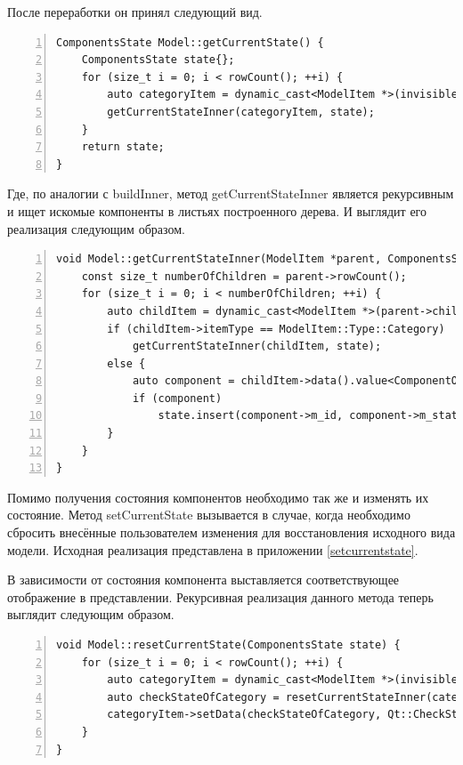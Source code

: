 \documentclass[bachelor, och, pract]{SCWorks}
\begin{document}
После переработки он принял следующий вид.

\begin{Verbatim}[fontsize=\small,breaklines=true,numbers=left]
ComponentsState Model::getCurrentState() {
    ComponentsState state{};
    for (size_t i = 0; i < rowCount(); ++i) {
        auto categoryItem = dynamic_cast<ModelItem *>(invisibleRootItem()->child(i));
        getCurrentStateInner(categoryItem, state);
    }
    return state;
}
\end{Verbatim}

Где, по аналогии с buildInner, метод getCurrentStateInner является рекурсивным и ищет искомые компоненты в листьях построенного дерева.
И выглядит его реализация следующим образом.

\begin{Verbatim}[fontsize=\small,breaklines=true,numbers=left]
void Model::getCurrentStateInner(ModelItem *parent, ComponentsState &state) {
    const size_t numberOfChildren = parent->rowCount();
    for (size_t i = 0; i < numberOfChildren; ++i) {
        auto childItem = dynamic_cast<ModelItem *>(parent->child(i));
        if (childItem->itemType == ModelItem::Type::Category)
            getCurrentStateInner(childItem, state);
        else {
            auto component = childItem->data().value<ComponentObject *>();
            if (component)
                state.insert(component->m_id, component->m_state);
        }
    }
}
\end{Verbatim}

Помимо получения состояния компонентов необходимо так же и изменять их состояние.
Метод setCurrentState вызывается в случае, когда необходимо сбросить внесённые пользователем изменения для восстановления исходного вида модели.
Исходная реализация представлена в приложении \ref{setcurrentstate}.

В зависимости от состояния компонента выставляется соответствующее отображение в представлении.
Рекурсивная реализация данного метода теперь выглядит следующим образом.

\begin{Verbatim}[fontsize=\small,breaklines=true,numbers=left]
void Model::resetCurrentState(ComponentsState state) {
    for (size_t i = 0; i < rowCount(); ++i) {
        auto categoryItem = dynamic_cast<ModelItem *>(invisibleRootItem()->child(i));
        auto checkStateOfCategory = resetCurrentStateInner(categoryItem, state);
        categoryItem->setData(checkStateOfCategory, Qt::CheckStateRole);
    }
}
\end{Verbatim}
\end{document}
